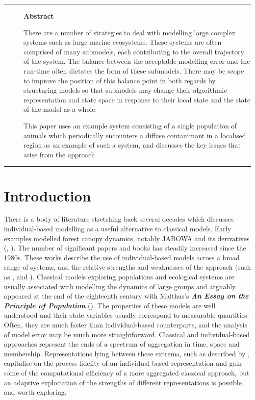 \rule{\textwidth}{2pt}

\begin{description}
  \item[ ]
    \textbf{Abstract}

    There are a number of strategies to deal with modelling large complex
    systems such as large marine ecosystems. These systems are often comprised
    of many submodels, each contributing to the overall trajectory of the
    system. The balance between the acceptable modelling error and the run-time
    often dictates the form of these submodels. There may be scope to improve
    the position of this balance point in both regards by structuring models so
    that submodels may change their algorithmic representation and state space
    in response to their local state and the state of the model as a whole.
  
    This paper uses an example system consisting of a single population of
    animals which periodically encounters a diffuse contaminant in a localised
    region as an example of such a system, and discusses the key issues that
    arise from the approach.
\end{description}

\rule{\textwidth}{2pt}

\section{Introduction}\label{Intro}

There is a body of literature stretching back several decades which discusses
individual-based modelling as a useful alternative to classical models. Early
examples modelled forest canopy dynamics, notably JABOWA and its derivatives
(\citet{Botkin72:1}, \citet{Botkin72:2}). The number of significant papers and
books has steadily increased since the 1980s. These works describe the use of
individual-based models across a broad range of systems, and the relative
strengths and weaknesses of the approach (such as \citet{Huston88:1},
\citet{DeAngelis92:1} and \citet{Grimm05:1}). Classical models exploring
populations and ecological systems are usually associated with modelling the
dynamics of large groups and arguably appeared at the end of the eighteenth
century with Malthus's {\em{{\textbf{An Essay on the Principle of
Population}}}} (\citeyear{Malthus:1}). The properties of these models are well
understood and their state variables usually correspond to measurable
quantities. Often, they are much faster than individual-based counterparts,
and the analysis of model error may be much more straightforward. Classical
and individual-based approaches represent the ends of a spectrum of
aggregation in time, space and membership. Representations lying between these
extrema, such as described by \citet{Scheffer95:1}, capitalise on the
process-fidelity of an individual-based representation and gain some of the
computational efficiency of a more aggregated classical approach, but an
adaptive exploitation of the strengths of different representations is
possible and worth exploring.

